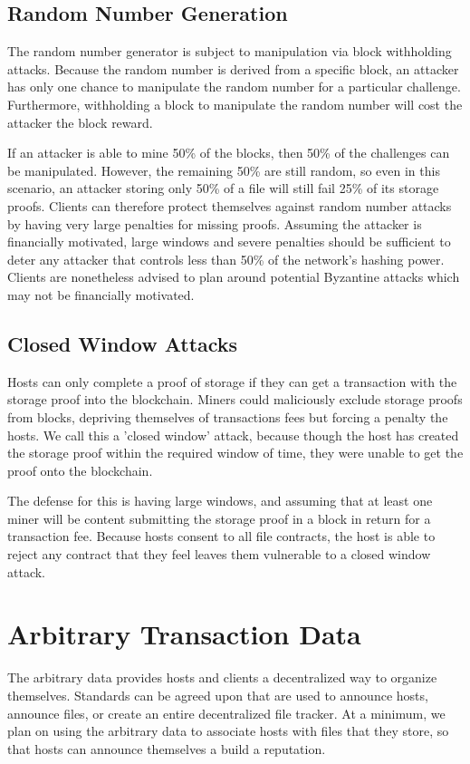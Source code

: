 \documentclass[twocolumn]{article}
\begin{document}
\subsection{Random Number Generation}
The random number generator is subject to manipulation via block withholding attacks.
Because the random number is derived from a specific block, an attacker has only one chance to manipulate the random number for a particular challenge.
Furthermore, withholding a block to manipulate the random number will cost the attacker the block reward.

If an attacker is able to mine 50\% of the blocks, then 50\% of the challenges can be manipulated.
However, the remaining 50\% are still random, so even in this scenario, an attacker storing only 50\% of a file will still fail 25\% of its storage proofs.
Clients can therefore protect themselves against random number attacks by having very large penalties for missing proofs.
Assuming the attacker is financially motivated, large windows and severe penalties should be sufficient to deter any attacker that controls less than 50\% of the network's hashing power.
Clients are nonetheless advised to plan around potential Byzantine attacks which may not be financially motivated.

\subsection{Closed Window Attacks}
Hosts can only complete a proof of storage if they can get a transaction with the storage proof into the blockchain.
Miners could maliciously exclude storage proofs from blocks, depriving themselves of transactions fees but forcing a penalty the hosts.
We call this a 'closed window' attack, because though the host has created the storage proof within the required window of time, they were unable to get the proof onto the blockchain.

The defense for this is having large windows, and assuming that at least one miner will be content submitting the storage proof in a block in return for a transaction fee.
Because hosts consent to all file contracts, the host is able to reject any contract that they feel leaves them vulnerable to a closed window attack.

\section{Arbitrary Transaction Data}
The arbitrary data provides hosts and clients a decentralized way to organize themselves.
Standards can be agreed upon that are used to announce hosts, announce files, or create an entire decentralized file tracker.
At a minimum, we plan on using the arbitrary data to associate hosts with files that they store, so that hosts can announce themselves a build a reputation.
\end{document}
